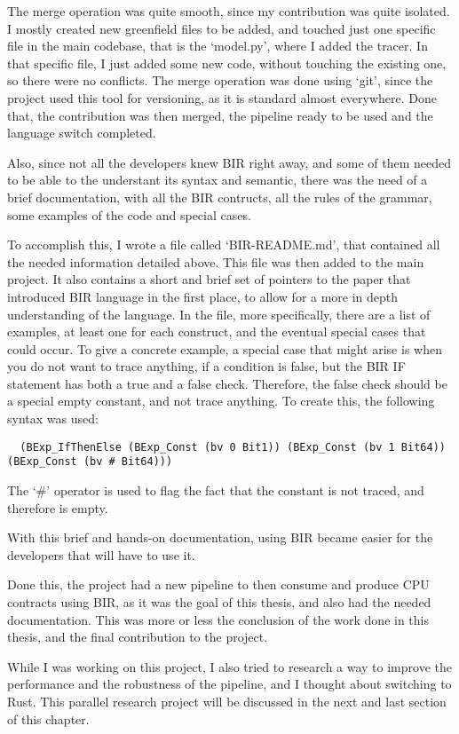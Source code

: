 The merge operation was quite smooth, since my contribution was quite isolated. I
mostly created new greenfield files to be added, and touched just one specific
file in the main codebase, that is the `model.py', where I added the tracer. In that
specific file, I just added some new code, without touching the existing one, so
there were no conflicts. The merge operation was done using `git', since the
project used this tool for versioning, as it is standard almost everywhere. Done
that, the contribution was then merged, the pipeline ready to be used and the
language switch completed.

Also, since not all the developers knew BIR right away, and some of them needed
to be able to the understant its syntax and semantic, there was the need of a brief
documentation, with all the BIR contructs, all the rules of the grammar, some
examples of the code and special cases.

To accomplish this, I wrote a file called `BIR-README.md', that contained all
the needed information detailed above. This file was then added to the main project.
It also contains a short and brief set of pointers to the paper that introduced
BIR language in the first place, to allow for a more in depth understanding of the
language. In the file, more specifically, there are a list of examples, at least
one for each construct, and the eventual special cases that could occur. To give
a concrete example, a special case that might arise is when you do not want to
trace anything, if a condition is false, but the BIR IF statement has both a
true and a false check. Therefore, the false check should be a special empty
constant, and not trace anything. To create this, the following syntax was used:
\begin{verbatim}
  (BExp_IfThenElse (BExp_Const (bv 0 Bit1)) (BExp_Const (bv 1 Bit64)) (BExp_Const (bv # Bit64)))
\end{verbatim}
The `\#' operator is used to flag the fact that the constant is not traced, and therefore
is empty.

With this brief and hands-on documentation, using BIR became easier for the
developers that will have to use it.

Done this, the project had a new pipeline to then consume and produce CPU contracts
using BIR, as it was the goal of this thesis, and also had the needed documentation.
This was more or less the conclusion of the work done in this thesis, and the final
contribution to the project.

While I was working on this project, I also tried to research a way to improve
the performance and the robustness of the pipeline, and I thought about switching
to Rust. This parallel research project will be discussed in the next and last
section of this chapter.

